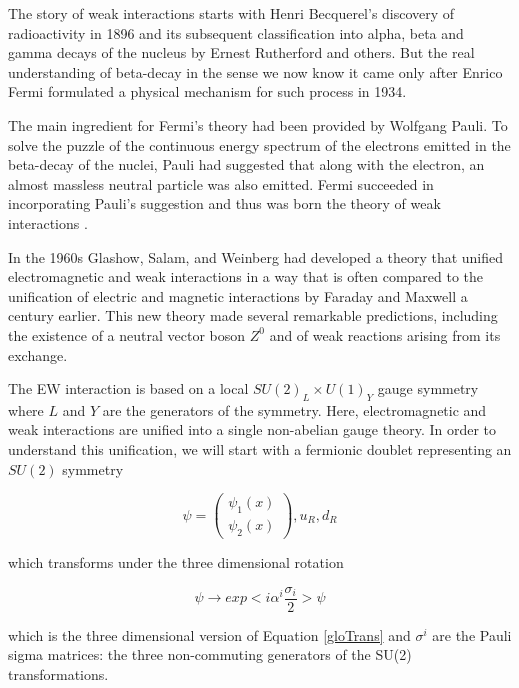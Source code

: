 The story of weak interactions starts with Henri Becquerel's discovery of radioactivity in 1896 and its subsequent classification into alpha, beta and gamma decays of the nucleus by Ernest Rutherford and others. But the real understanding of beta-decay in the sense we now know it came only after Enrico Fermi formulated a physical mechanism for such process in 1934.

The main ingredient for Fermi's theory had been provided by Wolfgang Pauli. To solve the puzzle of the continuous energy spectrum of the electrons emitted in the beta-decay of the nuclei, Pauli had suggested that along with the electron, an almost massless neutral particle was also emitted. Fermi succeeded in incorporating Pauli's suggestion and thus was born the theory of weak interactions \cite{Rajasekaran:2014vza}.

In the 1960s Glashow, Salam, and Weinberg had developed a theory\cite{Glashow:1961tr,PhysRevLett.19.1264,salam} that unified electromagnetic and weak interactions in a way that is often compared to the unification of electric and magnetic interactions by Faraday and Maxwell a century earlier. This new theory made several remarkable predictions, including the existence of a neutral vector boson $Z^{0}$ and of weak reactions arising from its exchange.

The EW interaction is based on a local $SU(2)_{L}\times U(1)_{Y}$ gauge symmetry where $L$ and $Y$ are the generators of the symmetry. Here, electromagnetic and weak interactions are unified into a single non-abelian gauge theory. In order to understand this unification, we will start with a fermionic doublet representing an $SU(2)$ symmetry

\begin{equation}
\psi = \begin{pmatrix}
	\psi_{1}(x) \\
	\psi_{2}(x)
\end{pmatrix}, u_{R}, d_{R}
\end{equation}

which transforms under the three dimensional rotation

\begin{equation}
\psi\rightarrow exp<i\alpha^{i}\frac{\sigma_{i}}{2}>\psi
\end{equation}

which is the three dimensional version of Equation \ref{gloTrans} and $\sigma^{i}$ are the Pauli sigma matrices: the three non-commuting generators of the SU(2) transformations.

